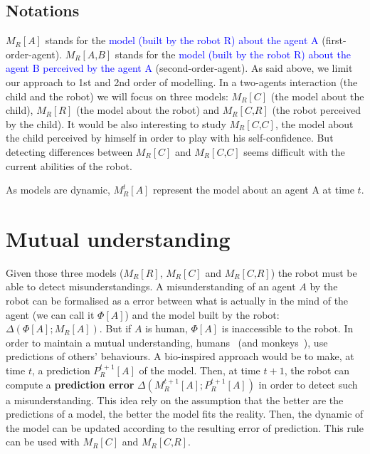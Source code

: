 \documentclass[conference]{IEEEtran}
\begin{document}
\subsection{Notations}
$M_R\left[\textit{A}\right]$ stands for the \textcolor{blue}{model (built by the robot R) about the agent A} (first-order-agent). $M_R\left[\textit{A,B}\right]$ stands for the \textcolor{blue}{model (built by the robot R) about the agent B perceived by the agent A} (second-order-agent). 
As said above, we limit our approach to 1st and 2nd order of modelling. In a two-agents interaction (the child and the robot) we will focus on three models: $ M_R\left[\textit{C}\right]$ (the model about the child), $ M_R\left[\textit{R}\right]$ (the model about the robot) and $ M_R\left[\textit{C,R}\right]$ (the robot perceived by the child). 
It would be also interesting to study $ M_R\left[\textit{C,C}\right]$, the model about the child perceived by himself in order to play with his self-confidence. But detecting differences between $ M_R\left[\textit{C}\right]$ and $ M_R\left[\textit{C,C}\right]$ seems difficult with the current abilities of the robot. 

As models are dynamic, $ M^t_R\left[\textit{A}\right]$ represent the model about an agent A at time $t$.

\section{Mutual understanding}
Given those three models ($ M_R\left[\textit{R}\right]$, $ M_R\left[\textit{C}\right]$ and $ M_R\left[\textit{C,R}\right]$) the robot must be able to detect misunderstandings. 
A misunderstanding of an agent $A$ by the robot can be formalised as a error between what is actually in the mind of the agent (we can call it $\Phi[A]$) and the model built by the robot: $\Delta \left(\Phi[A] ; M_R\left[\textit{A}\right]\right)$. But if $A$ is human, $\Phi[A]$ is inaccessible to the robot. In order to maintain a mutual understanding, humans~\cite{suzuki2015neural} (and monkeys~\cite{haroush2015neuronal}), use predictions of others' behaviours. A bio-inspired approach would be to make, at time $t$, a prediction $P^{t+1}_R\left[\textit{A}\right]$ of the model. Then, at time $t+1$, the robot can compute a \textbf{prediction error} $\Delta \left( M^{t+1}_R\left[\textit{A}\right]; P^{t+1}_R\left[\textit{A}\right]\right)$ in order to detect such a misunderstanding. This idea rely on the assumption that the better are the predictions of a model, the better the model fits the reality. Then, the dynamic of the model can be updated according to the resulting error of prediction. This rule can be used with $ M_R\left[\textit{C}\right]$ and $ M_R\left[\textit{C,R}\right]$. 
\end{document}
